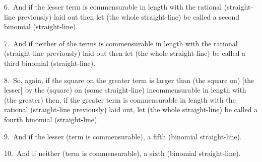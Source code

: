 \begin{Parallel}{}{}
{6.~And if the lesser term is commensurable in length with the  rational (straight-line previously) laid
out then let (the whole straight-line) be called a
second binomial (straight-line).

7.~And if neither of the terms is commensurable in length with the 
rational (straight-line previously) laid out then let (the whole straight-line) be called a third
binomial (straight-line).

8.~So, again, if the square on the greater term is larger than (the
square on) [the lesser] by the (square) on (some straight-line)
incommensurable in length with (the greater) then, if the
greater term is commensurable in length with the  rational
(straight-line previously) laid out, let (the whole straight-line) be called a fourth
binomial (straight-line).

9.~And if the lesser (term is commensurable), a fifth (binomial straight-line).

10.~And if neither (term is commensurable), a sixth (binomial straight-line).}
\end{Parallel}


